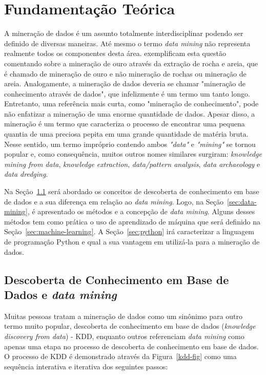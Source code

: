 \chapter{Fundamentação Teórica}\label{ch:fundaments-teorico}
A mineração de dados é um assunto totalmente interdisciplinar podendo ser definido de diversas maneiras. Até mesmo o termo \textit{data mining} não representa realmente todos os componentes desta área.  exemplificam esta questão comentando sobre a mineração de ouro através da extração de rocha e areia, que é chamado de mineração de ouro e não mineração de rochas ou mineração de areia. Analogamente, a mineração de dados deveria se chamar "mineração de conhecimento através de dados", que infelizmente é um termo um tanto longo. Entretanto, uma referência mais curta, como "mineração de conhecimento", pode não enfatizar a mineração de uma enorme quantidade de dados. Apesar disso, a mineração é um termo que caracteriza o processo de encontrar uma pequena quantia de uma preciosa pepita em uma grande quantidade de matéria bruta. Nesse sentido, um termo impróprio contendo ambos \textit{"data"} e \textit{"mining"} se tornou popular e, como consequência, muitos outros nomes similares surgiram: \textit{knowledge mining from data}, \textit{knowledge extraction}, \textit{data/pattern analysis}, \textit{data archaeology} e \textit{data dredging}.

Na Seção~\ref{sec:kdd} será abordado os conceitos de descoberta de conhecimento em base de dados e a sua diferença em relação ao \textit{data mining}. Logo, na Seção~\ref{sec:data-mining}, é apresentado os métodos e a concepção de \textit{data mining}. Alguns desses métodos tem como prática o uso de aprendizado de máquina que será definido na Seção~\ref{sec:machine-learning}. A Seção~\ref{sec:python} irá caracterizar a linguagem de programação Python e qual a sua vantagem em utilizá-la para a mineração de dados.

\section{Descoberta de Conhecimento em Base de Dados e \textit{data mining}}\label{sec:kdd}
Muitas pessoas tratam a mineração de dados como um sinônimo para outro termo muito popular, descoberta de conhecimento em base de dados (\textit{knowledge discovery from data}) - KDD, enquanto outros referenciam \textit{data mining} como apenas uma etapa no processo de descoberta de conhecimento em base de dados. O processo de KDD é demonstrado através da  Figura~\ref{kdd-fig} como uma sequência interativa e iterativa dos seguintes passos: \\ \\ \\ \\ \\ \\


